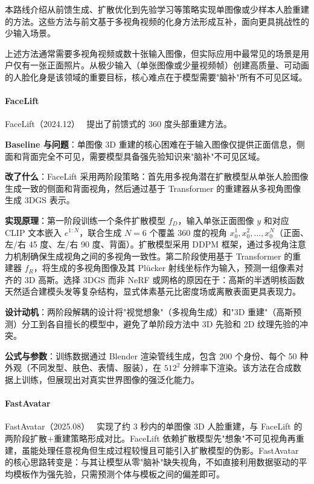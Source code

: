 本路线介绍从前馈生成、扩散优化到先验学习等策略实现单图像或少样本人脸重建的方法。这些方法与前文基于多视角视频的化身方法形成互补，面向更具挑战性的少输入场景。

上述方法通常需要多视角视频或数十张输入图像，但实际应用中最常见的场景是用户仅有一张正面照片。从极少输入（单张图像或少量视频帧）创建高质量、可动画的人脸化身是该领域的重要目标，核心难点在于模型需要"脑补"所有不可见区域。

\paragraph{FaceLift}

FaceLift（2024.12）~\cite{2412_17812} 提出了前馈式的 360 度头部重建方法。

\textbf{Baseline 与问题}：单图像 3D 重建的核心困难在于输入图像仅提供正面信息，侧面和背面完全不可见，需要模型具备强先验知识来"脑补"不可见区域。

\textbf{改了什么}：FaceLift 采用两阶段策略：首先用多视角潜在扩散模型从单张人脸图像生成一致的侧面和背面视角，然后通过基于 Transformer 的重建器从多视角图像生成 3DGS 表示。

\textbf{实现原理}：第一阶段训练一个条件扩散模型 $f_D$，输入单张正面图像 $y$ 和对应 CLIP 文本嵌入 $e^{1:N}$，联合生成 $N=6$ 个覆盖 360 度的视角 $x_0^1, x_0^2, \ldots, x_0^N$（正面、左/右 45 度、左/右 90 度、背面）。扩散模型采用 DDPM 框架，通过多视角注意力机制确保生成视角之间的多视角一致性。第二阶段使用基于 Transformer 的重建器 $f_R$，将生成的多视角图像及其 Plücker 射线坐标作为输入，预测一组像素对齐的 3D 高斯。选择 3DGS 而非 NeRF 或网格的原因在于：高斯的半透明核函数天然适合建模头发等复杂结构，显式体素基元比密度场或离散表面更具表现力。

\textbf{设计动机}：两阶段解耦的设计将"视觉想象"（多视角生成）和"3D 重建"（高斯预测）分工到各自擅长的模型中，避免了单阶段方法中 3D 先验和 2D 纹理先验的冲突。

\textbf{公式与参数}：训练数据通过 Blender 渲染管线生成，包含 200 个身份、每个 50 种外观（不同发型、肤色、表情、服装），在 $512^2$ 分辨率下渲染。该方法在合成数据上训练，但展现出对真实世界图像的强泛化能力。

\paragraph{FastAvatar}

FastAvatar（2025.08）~\cite{2508_18389} 实现了约 3 秒内的单图像 3D 人脸重建，与 FaceLift 的两阶段扩散+重建策略形成对比。FaceLift 依赖扩散模型先"想象"不可见视角再重建，虽能处理任意视角但生成过程较慢且可能引入扩散模型的伪影。FastAvatar 的核心思路转变是：与其让模型从零"脑补"缺失视角，不如直接利用数据驱动的平均模板作为强先验，只需预测个体与模板之间的偏差即可。


